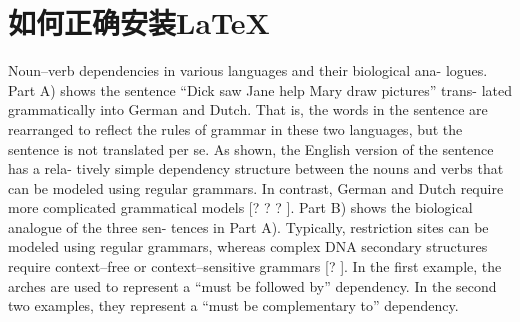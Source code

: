 \chapter{如何正确安装\LaTeX\ }

Noun–verb dependencies in various languages and their biological ana- logues. Part A) shows the sentence “Dick saw Jane help Mary draw pictures” trans- lated grammatically into German and Dutch. That is, the words in the sentence are rearranged to reflect the rules of grammar in these two languages, but the sentence is not translated per se. As shown, the English version of the sentence has a rela- tively simple dependency structure between the nouns and verbs that can be modeled using regular grammars. In contrast, German and Dutch require more complicated grammatical models [? ? ? ]. Part B) shows the biological analogue of the three sen- tences in Part A). Typically, restriction sites can be modeled using regular grammars, whereas complex DNA secondary structures require context–free or context–sensitive grammars [? ]. In the first example, the arches are used to represent a “must be followed by” dependency. In the second two examples, they represent a “must be complementary to” dependency.
